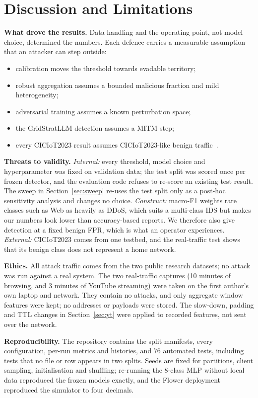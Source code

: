 \documentclass[conference]{IEEEtran}
\begin{document}
\section{Discussion and Limitations}
\textbf{What drove the results.} Data handling and the operating point, not model choice, determined the numbers. Each defence carries a measurable assumption that an attacker can step outside:
\begin{itemize}
\item calibration moves the threshold towards evadable territory;
\item robust aggregation assumes a bounded malicious fraction and mild heterogeneity;
\item adversarial training assumes a known perturbation space;
\item the GridStratLLM detection assumes a MITM step;
\item every CICIoT2023 result assumes CICIoT2023-like benign traffic~\cite{arp2022dos}.
\end{itemize}

\textbf{Threats to validity.} \emph{Internal:} every threshold, model choice and hyperparameter was fixed on validation data; the test split was scored once per frozen detector, and the evaluation code refuses to re-score an existing test result. The sweep in Section~\ref{sec:sweep} re-uses the test split only as a post-hoc sensitivity analysis and changes no choice. \emph{Construct:} macro-F1 weights rare classes such as Web as heavily as DDoS, which suits a multi-class IDS but makes our numbers look lower than accuracy-based reports. We therefore also give detection at a fixed benign FPR, which is what an operator experiences. \emph{External:} CICIoT2023 comes from one testbed, and the real-traffic test shows that its benign class does not represent a home network.

\textbf{Ethics.} All attack traffic comes from the two public research datasets; no attack was run against a real system. The two real-traffic captures (10 minutes of browsing, and 3 minutes of YouTube streaming) were taken on the first author's own laptop and network. They contain no attacks, and only aggregate window features were kept; no addresses or payloads were stored. The slow-down, padding and TTL changes in Section~\ref{sec:yt} were applied to recorded features, not sent over the network.

\textbf{Reproducibility.} The repository contains the split manifests, every configuration, per-run metrics and histories, and 76 automated tests, including tests that no file or row appears in two splits. Seeds are fixed for partitions, client sampling, initialisation and shuffling; re-running the 8-class MLP without local data reproduced the frozen models exactly, and the Flower deployment reproduced the simulator to four decimals.
\end{document}

